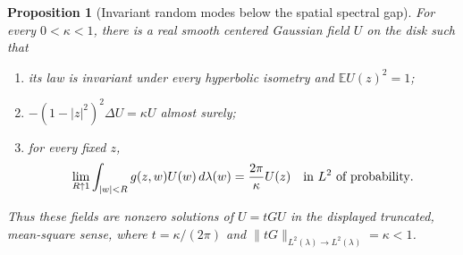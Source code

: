 \documentclass[11pt,a4paper]{article}
\numberwithin{equation}{section}
\newtheorem{proposition}[theorem]{Proposition}
\theoremstyle{definition}
\theoremstyle{remark}
\newcommand{\E}{\mathbb E}
\begin{document}
\begin{proposition}[Invariant random modes below the spatial spectral gap]
\label{prop:invariant-subgap-gaussian-fields}
For every $0<\kappa<1$, there is a real smooth centered Gaussian
field $U$ on the disk such that
\begin{enumerate}
\item its law is invariant under every hyperbolic isometry and
$\E U(z)^2=1$;
\item $-(1-|z|^2)^2\Delta U=\kappa U$ almost surely;
\item for every fixed $z$,
\begin{equation}
 \lim_{R\uparrow1}\int_{|w|<R}g(z,w)U(w)\,d\lambda(w)
       =\frac{2\pi}{\kappa}U(z)
       \quad\hbox{in }L^2\hbox{ of probability}.
 \label{eq:invariant-subgap-green-limit}
\end{equation}
\end{enumerate}
Thus these fields are nonzero solutions of $U=tGU$ in the displayed
truncated, mean-square sense, where $t=\kappa/(2\pi)$ and
$\|tG\|_{L^2(\lambda)\to L^2(\lambda)}=\kappa<1$.
\end{proposition}
\end{document}
